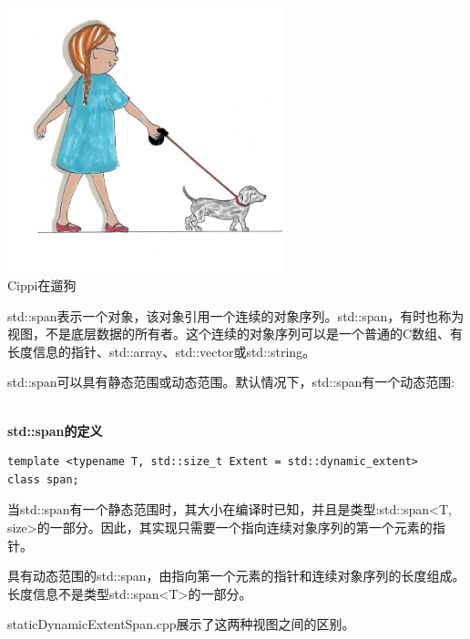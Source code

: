 \begin{center}
\includegraphics[width=0.6\textwidth]{content/3/chapter5/images/3.png}\\
Cippi在遛狗
\end{center}

std::span表示一个对象，该对象引用一个连续的对象序列。std::span，有时也称为视图，不是底层数据的所有者。这个连续的对象序列可以是一个普通的C数组、有长度信息的指针、std::array、std::vector或std::string。

std::span可以具有静态范围或动态范围。默认情况下，std::span有一个动态范围:

\hspace*{\fill} \\ %
\noindent
\textbf{std::span的定义}
\begin{lstlisting}[style=styleCXX]
template <typename T, std::size_t Extent = std::dynamic_extent>
class span;
\end{lstlisting}


当std::span有一个静态范围时，其大小在编译时已知，并且是类型:std::span<T, size>的一部分。因此，其实现只需要一个指向连续对象序列的第一个元素的指针。

具有动态范围的std::span，由指向第一个元素的指针和连续对象序列的长度组成。长度信息不是类型std::span<T>的一部分。

staticDynamicExtentSpan.cpp展示了这两种视图之间的区别。

